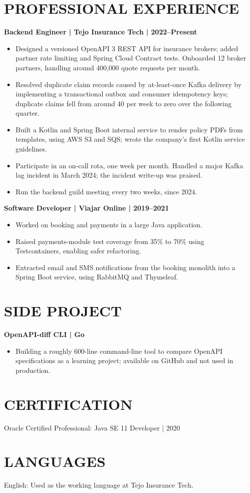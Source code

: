 \documentclass[11pt,a4paper]{article}
\begin{document}
\section*{PROFESSIONAL EXPERIENCE}
\textbf{Backend Engineer | Tejo Insurance Tech | 2022--Present}
\begin{itemize}
\item Designed a versioned OpenAPI 3 REST API for insurance brokers; added partner rate limiting and Spring Cloud Contract tests. Onboarded 12 broker partners, handling around 400,000 quote requests per month.
\item Resolved duplicate claim records caused by at-least-once Kafka delivery by implementing a transactional outbox and consumer idempotency keys; duplicate claims fell from around 40 per week to zero over the following quarter.
\item Built a Kotlin and Spring Boot internal service to render policy PDFs from templates, using AWS S3 and SQS; wrote the company’s first Kotlin service guidelines.
\item Participate in an on-call rota, one week per month. Handled a major Kafka lag incident in March 2024; the incident write-up was praised.
\item Run the backend guild meeting every two weeks, since 2024.
\end{itemize}
\textbf{Software Developer | Viajar Online | 2019--2021}
\begin{itemize}
\item Worked on booking and payments in a large Java application.
\item Raised payments-module test coverage from 35\% to 70\% using Testcontainers, enabling safer refactoring.
\item Extracted email and SMS notifications from the booking monolith into a Spring Boot service, using RabbitMQ and Thymeleaf.
\end{itemize}

\section*{SIDE PROJECT}
\textbf{OpenAPI-diff CLI | Go}
\begin{itemize}
\item Building a roughly 600-line command-line tool to compare OpenAPI specifications as a learning project; available on GitHub and not used in production.
\end{itemize}

\section*{CERTIFICATION}
Oracle Certified Professional: Java SE 11 Developer | 2020

\section*{LANGUAGES}
English: Used as the working language at Tejo Insurance Tech.
\end{document}
